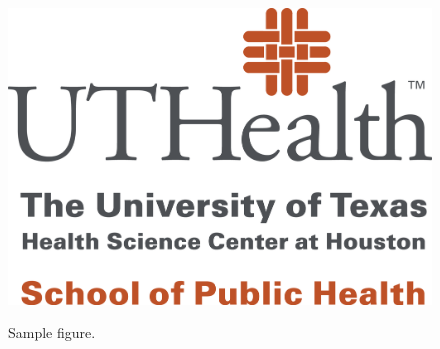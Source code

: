 \documentclass[12pt]{article}
\begin{document}
\begin{figure}[H]
\centering
\includegraphics[scale=0.5]{SPH_2c_vert+below_lrg}
\label{fig: sample}
\caption{Sample figure.}
\end{figure}
















\end{document}
